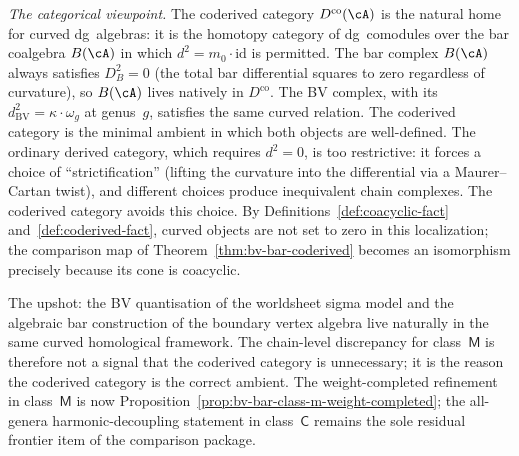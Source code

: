 \begin{remark}
\emph{The categorical viewpoint.}
The coderived category $D^{\mathrm{co}}(\cA)$ is the natural
home for curved dg~algebras: it is the homotopy category of
dg~comodules over the bar coalgebra $B(\cA)$ in which
$d^2 = m_0 \cdot \mathrm{id}$ is permitted. The bar complex
$B(\cA)$ always satisfies $D_B^2 = 0$ (the total bar differential
squares to zero regardless of curvature), so $B(\cA)$ lives
natively in $D^{\mathrm{co}}$. The BV complex, with its
$d^2_{\mathrm{BV}} = \kappa \cdot \omega_g$ at genus~$g$,
satisfies the same curved relation. The coderived
category is the minimal ambient in which both objects are
well-defined. The ordinary derived
category, which requires $d^2 = 0$, is too restrictive: it
forces a choice of ``strictification'' (lifting the curvature
into the differential via a Maurer--Cartan twist), and different
choices produce inequivalent chain complexes. The coderived
category avoids this choice. By
Definitions~\ref{def:coacyclic-fact} and~\ref{def:coderived-fact},
curved objects are not set to zero in this localization; the
comparison map of Theorem~\ref{thm:bv-bar-coderived} becomes an
isomorphism precisely because its cone is coacyclic.

The upshot: the BV quantisation of the worldsheet sigma model
and the algebraic bar construction of the boundary vertex algebra
live naturally in the same curved homological framework. The
chain-level discrepancy for class~$\mathsf{M}$ is therefore not a
signal that the coderived category is unnecessary; it is the reason
the coderived category is the correct ambient. The weight-completed
refinement in class~$\mathsf{M}$ is now
Proposition~\ref{prop:bv-bar-class-m-weight-completed}; the
all-genera harmonic-decoupling statement in class~$\mathsf{C}$
remains the sole residual frontier item of the comparison package.
\end{remark}

